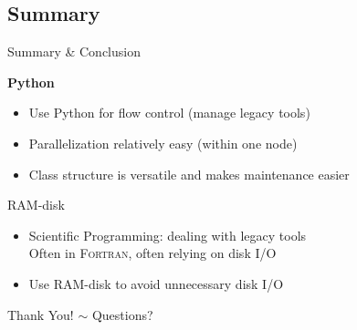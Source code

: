 \documentclass[hyperref={pdfpagelabels=false},compress,final]{beamer}
\begin{document}
\subsection{Summary}

\begin{frame}{Summary \& Conclusion}

  {\Large \color{teal} \textbf{Python} }\smallskip
  \begin{itemize}
    \item Use Python for flow control (manage legacy tools) \medskip
    \item Parallelization relatively easy (within one node) \medskip
    \item Class structure is versatile and makes maintenance easier \medskip
  \end{itemize}
  \bigskip
  {\Large \color{purple} {RAM}-disk }\smallskip
  \begin{itemize}
    \item Scientific Programming: dealing with legacy tools\\
          Often in \textsc{Fortran}, often relying on disk I/O \medskip
    \item Use RAM-disk to avoid unnecessary disk I/O \medskip
  \end{itemize}
\end{frame}

\begin{frame}
 \vfill
 \begin{center}
 \LARGE
 Thank You!\hspace{1.5cm}  $\sim$ \hspace{1.5cm} Questions?
 \end{center}
 \vfill
\end{frame}
\end{document}
